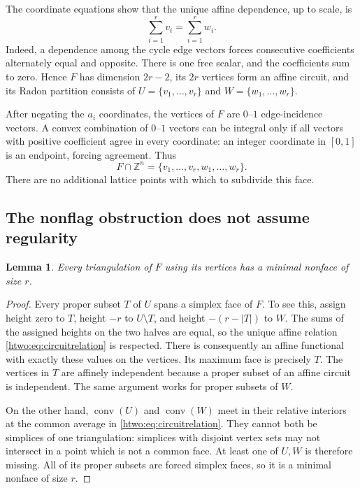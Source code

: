 \documentclass[11pt]{article}
\numberwithin{equation}{section}
\newtheorem{lemma}[theorem]{Lemma}
\theoremstyle{definition}
\newcommand{\Z}{\mathbb Z}
\newcommand{\conv}{\operatorname{conv}}
\begin{document}
The coordinate equations show that the unique affine dependence, up to
scale, is
\begin{equation}
 \sum_{i=1}^{r}v_i=\sum_{i=1}^{r}w_i.
 \label{htwo:eq:circuitrelation}
\end{equation}
Indeed, a dependence among the cycle edge vectors forces consecutive
coefficients alternately equal and opposite. There is one free scalar,
and the coefficients sum to zero. Hence $F$ has dimension $2r-2$, its
$2r$ vertices form an affine circuit, and its Radon partition consists
of $U=\{v_1,\ldots,v_r\}$ and $W=\{w_1,\ldots,w_r\}$.

After negating the $a_i$ coordinates, the vertices of $F$ are $0$--$1$
edge-incidence vectors. A convex combination of $0$--$1$ vectors can be
integral only if all vectors with positive coefficient agree in every
coordinate: an integer coordinate in $[0,1]$ is an endpoint, forcing
agreement. Thus
\begin{equation}
 F\cap\Z^n=\{v_1,\ldots,v_r,w_1,\ldots,w_r\}.
 \label{htwo:eq:emptycircuit}
\end{equation}
There are no additional lattice points with which to subdivide this face.

\subsection{The nonflag obstruction does not assume regularity}

\begin{lemma}\label{htwo:lem:circuitmissing}
Every triangulation of $F$ using its vertices has a minimal nonface of
size $r$.
\end{lemma}
\begin{proof}
Every proper subset $T$ of $U$ spans a simplex face of $F$. To see this,
assign height zero to $T$, height $-r$ to $U\setminus T$, and height
$-(r-|T|)$ to $W$. The sums of the assigned heights on the two halves
are equal, so the unique affine relation \eqref{htwo:eq:circuitrelation}
is respected. There is consequently an affine functional with exactly
these values on the vertices. Its maximum face is precisely $T$.
The vertices in $T$ are affinely independent because a proper subset of
an affine circuit is independent. The same argument works for proper
subsets of $W$.

On the other hand, $\conv(U)$ and $\conv(W)$ meet in their relative
interiors at the common average in \eqref{htwo:eq:circuitrelation}. They
cannot both be simplices of one triangulation: simplices with disjoint
vertex sets may not intersect in a point which is not a common face.
At least one of $U,W$ is therefore missing. All of its proper subsets
are forced simplex faces, so it is a minimal nonface of size $r$.
\end{proof}
\end{document}
